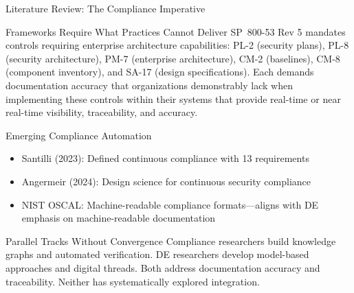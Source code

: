 \documentclass{beamer}
\begin{document}
\begin{frame}[allowframebreaks]{Literature Review: The Compliance Imperative}
  \begin{block}{Frameworks Require What Practices Cannot Deliver}
    SP~800-53 Rev 5 mandates controls requiring enterprise architecture capabilities: PL-2 (security plans), PL-8 (security architecture), PM-7 (enterprise architecture), CM-2 (baselines), CM-8 (component inventory), and SA-17 (design specifications). Each demands documentation accuracy that organizations demonstrably lack when implementing these controls within their systems that provide real-time or near real-time visibility, traceability, and accuracy.
  \end{block}

  \vspace{1.5cm}

  \begin{block}{Emerging Compliance Automation}
    \begin{itemize}
      \item Santilli (2023): Defined continuous compliance with 13 requirements
      \item Angermeir (2024): Design science for continuous security compliance
      \item NIST OSCAL: Machine-readable compliance formats---aligns with DE emphasis on machine-readable documentation
    \end{itemize}
  \end{block}

  \vspace{2.0cm}

  \begin{block}{Parallel Tracks Without Convergence}
    Compliance researchers build knowledge graphs and automated verification. DE researchers develop model-based approaches and digital threads. Both address documentation accuracy and traceability. Neither has systematically explored integration.
  \end{block}
\end{frame}
\end{document}

